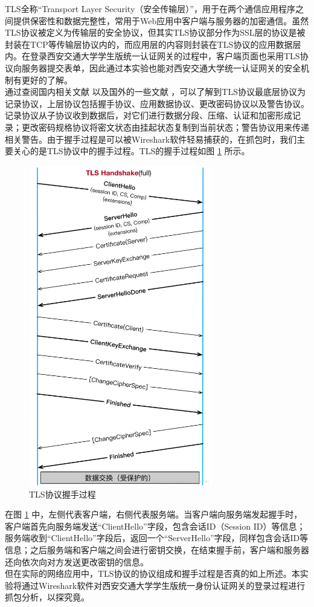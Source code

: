 \qquad 
TLS全称“Transport Layer Security（安全传输层）”，用于在两个通信应用程序之间提供保密性和数据完整性，常用于Web应用中客户端与服务器的加密通信。虽然TLS协议被定义为传输层的安全协议，但其实TLS协议部分作为SSL层的协议是被封装在TCP等传输层协议内的，而应用层的内容则封装在TLS协议的应用数据层内。在登录西安交通大学学生版统一认证网关的过程中，客户端页面也采用TLS协议向服务器提交表单，因此通过本实验也能对西安交通大学统一认证网关的安全机制有更好的了解。\\
\qquad
通过查阅国内相关文献 \cite{TLS-1} 以及国外的一些文献 \cite{TLS-2} ，可以了解到TLS协议最底层协议为记录协议，上层协议包括握手协议、应用数据协议、更改密码协议以及警告协议。记录协议从子协议收到数据后，对它们进行数据分段、压缩、认证和加密形成记录；更改密码规格协议将密文状态由挂起状态复制到当前状态；警告协议用来传递相关警告。由于握手过程是可以被Wireshark软件轻易捕获的，在抓包时，我们主要关心的是TLS协议中的握手过程。TLS的握手过程如图 \ref{fig1} 所示。\\
\begin{figure}
	\centering
	\includegraphics[width=8cm]{image/TLS-Handshake}
	\caption{TLS协议握手过程 \cite{TLS-3}}
	\label{fig1}
\end{figure}
\qquad
在图 \ref{fig1} 中，左侧代表客户端，右侧代表服务端。当客户端向服务端发起握手时，客户端首先向服务端发送“ClientHello”字段，包含会话ID（Session ID）等信息；服务端收到“ClientHello”字段后，返回一个“ServerHello”字段，同样包含会话ID等信息；之后服务端和客户端之间会进行密钥交换，在结束握手前，客户端和服务器还向依次向对方发送更改密钥的信息。\\
\qquad
但在实际的网络应用中，TLS协议的协议组成和握手过程是否真的如上所述。本实验将通过Wireshark软件对西安交通大学学生版统一身份认证网关的登录过程进行抓包分析，以探究竟。\\